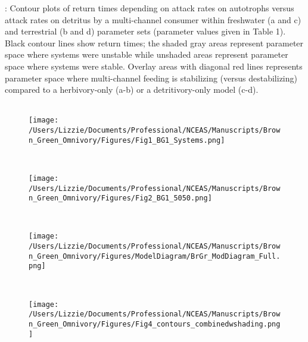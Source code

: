 \documentclass[12pt,a4paper,oneside]{article}
\begin{document}
: Contour plots of return times
 depending on attack rates on autotrophs 
versus attack rates on detritus by a multi-channel consumer within freshwater (a and c)
and terrestrial (b and d) parameter sets (parameter values given in Table 1). 
Black contour lines show return times; the shaded gray areas represent parameter space where systems were unstable while unshaded areas represent parameter space where systems were
stable. Overlay areas with diagonal red lines represents parameter space where
multi-channel feeding is stabilizing (versus destabilizing) compared to a herbivory-only (a-b) or a detritivory-only model (c-d).\\

\newpage
{}
\\
\begin{figure}[h!]
\centering
\noindent \texttt{[image: /Users/Lizzie/Documents/Professional/NCEAS/Manuscripts/Brown\_Green\_Omnivory/Figures/Fig1\_BG1\_Systems.png]}
\end{figure}

\newpage
{}
\\
\begin{figure}[h!]
\centering
\noindent \texttt{[image: /Users/Lizzie/Documents/Professional/NCEAS/Manuscripts/Brown\_Green\_Omnivory/Figures/Fig2\_BG1\_5050.png]}
\end{figure}

\newpage
{}
\\
\begin{figure}[h!]
\centering
\noindent \texttt{[image: /Users/Lizzie/Documents/Professional/NCEAS/Manuscripts/Brown\_Green\_Omnivory/Figures/ModelDiagram/BrGr\_ModDiagram\_Full.png]}
\end{figure}

\newpage
{}
\\
\begin{figure}[h!]
\centering
\noindent \texttt{[image: /Users/Lizzie/Documents/Professional/NCEAS/Manuscripts/Brown\_Green\_Omnivory/Figures/Fig4\_contours\_combinedwshading.png]}
\end{figure}
\end{document}
